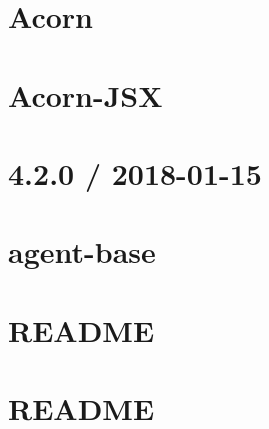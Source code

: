 \let\mypdfximage\pdfximage\def\pdfximage{\immediate\mypdfximage}\documentclass[twoside]{book}
\newcommand{\+}{\discretionary{\mbox{\scriptsize$\hookleftarrow$}}{}{}}
\begin{document}
\chapter{Acorn}
\label{md_heap-visualizer_node_modules_acorn__r_e_a_d_m_e}

\chapter{Acorn-\/\+J\+SX}
\label{md_heap-visualizer_node_modules_acorn-jsx__r_e_a_d_m_e}

\chapter{4.2.0 / 2018-\/01-\/15}
\label{md_heap-visualizer_node_modules_agent-base__history}

\chapter{agent-\/base}
\label{md_heap-visualizer_node_modules_agent-base__r_e_a_d_m_e}

\chapter{R\+E\+A\+D\+ME}
\label{md_heap-visualizer_node_modules_ajv_lib_dotjs__r_e_a_d_m_e}

\chapter{R\+E\+A\+D\+ME}
\label{md_heap-visualizer_node_modules_ajv__r_e_a_d_m_e}

\end{document}
